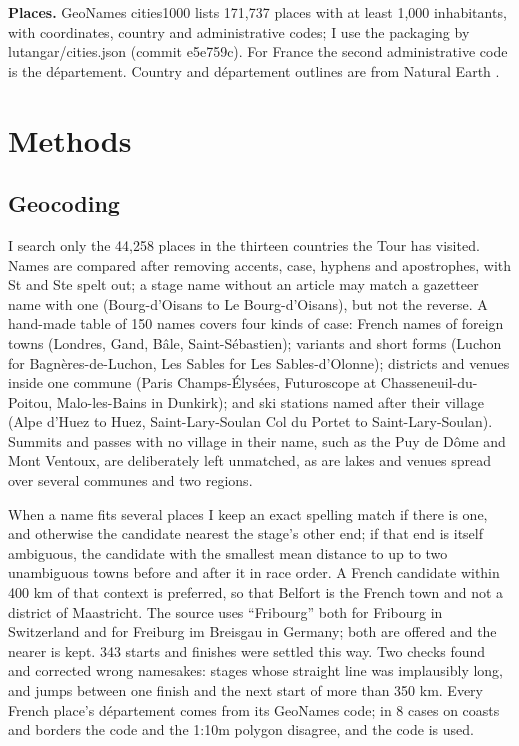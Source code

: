 \documentclass[11pt,a4paper]{article}
\begin{document}
\textbf{Places.} GeoNames cities1000 lists 171,737 places with at least 1,000 inhabitants, with coordinates, country and administrative codes; I use the packaging by lutangar/cities.json (commit e5e759c). For France the second administrative code is the département. Country and département outlines are from Natural Earth \citep{naturalearth}.

\section{Methods}
\subsection{Geocoding}
I search only the 44,258 places in the thirteen countries the Tour has visited. Names are compared after removing accents, case, hyphens and apostrophes, with St and Ste spelt out; a stage name without an article may match a gazetteer name with one (Bourg-d'Oisans to Le Bourg-d'Oisans), but not the reverse. A hand-made table of 150 names covers four kinds of case: French names of foreign towns (Londres, Gand, Bâle, Saint-Sébastien); variants and short forms (Luchon for Bagnères-de-Luchon, Les Sables for Les Sables-d'Olonne); districts and venues inside one commune (Paris Champs-Élysées, Futuroscope at Chasseneuil-du-Poitou, Malo-les-Bains in Dunkirk); and ski stations named after their village (Alpe d'Huez to Huez, Saint-Lary-Soulan Col du Portet to Saint-Lary-Soulan). Summits and passes with no village in their name, such as the Puy de Dôme and Mont Ventoux, are deliberately left unmatched, as are lakes and venues spread over several communes and two regions.

When a name fits several places I keep an exact spelling match if there is one, and otherwise the candidate nearest the stage's other end; if that end is itself ambiguous, the candidate with the smallest mean distance to up to two unambiguous towns before and after it in race order. A French candidate within 400 km of that context is preferred, so that Belfort is the French town and not a district of Maastricht. The source uses ``Fribourg'' both for Fribourg in Switzerland and for Freiburg im Breisgau in Germany; both are offered and the nearer is kept. 343 starts and finishes were settled this way. Two checks found and corrected wrong namesakes: stages whose straight line was implausibly long, and jumps between one finish and the next start of more than 350 km. Every French place's département comes from its GeoNames code; in 8 cases on coasts and borders the code and the 1:10m polygon disagree, and the code is used.
\end{document}
